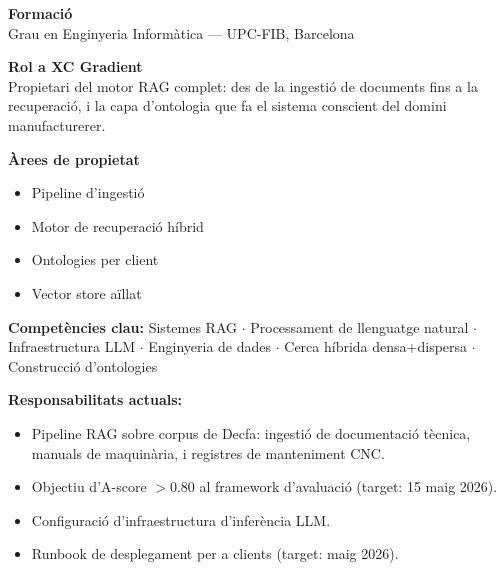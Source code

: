 \documentclass[11pt,a4paper]{article}
\begin{document}
\begin{profilebox}[title={\large\bfseries\color{dark} Arnau Noguer \hfill \normalsize CTO / AI}]

\begin{minipage}[t]{0.65\textwidth}
\textbf{Formació}\\
Grau en Enginyeria Informàtica --- UPC-FIB, Barcelona

\vspace{0.5em}
\textbf{Rol a XC Gradient}\\
Propietari del motor RAG complet: des de la ingestió de documents fins a la recuperació, i la capa d'ontologia que fa el sistema conscient del domini manufacturerer.
\end{minipage}%
\hfill%
\begin{minipage}[t]{0.32\textwidth}
\small
\textbf{Àrees de propietat}
\begin{itemize}[leftmargin=0.8em,itemsep=1pt,topsep=2pt]
\item Pipeline d'ingestió
\item Motor de recuperació híbrid
\item Ontologies per client
\item Vector store aïllat
\end{itemize}
\end{minipage}

\vspace{0.5em}
\begin{skillbox}
\small\textbf{Competències clau:} Sistemes RAG $\cdot$ Processament de llenguatge natural $\cdot$ Infraestructura LLM $\cdot$ Enginyeria de dades $\cdot$ Cerca híbrida densa+dispersa $\cdot$ Construcció d'ontologies
\end{skillbox}

\vspace{0.3em}
\small\textbf{Responsabilitats actuals:}
\begin{itemize}[leftmargin=1.2em,itemsep=1pt]
\item Pipeline RAG sobre corpus de Decfa: ingestió de documentació tècnica, manuals de maquinària, i registres de manteniment CNC.
\item Objectiu d'A-score $>$0.80 al framework d'avaluació (target: 15 maig 2026).
\item Configuració d'infraestructura d'inferència LLM.
\item Runbook de desplegament per a clients (target: maig 2026).
\end{itemize}
\end{profilebox}
\end{document}
